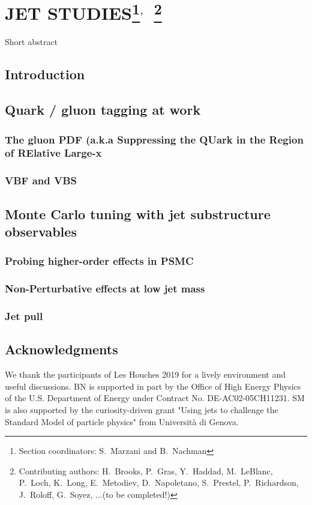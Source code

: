 \documentclass[11pt]{cernrep}
\begin{document}
\section{JET STUDIES\protect\footnote{Section coordinators: S.~Marzani and B.~Nachman}$^{,}$~\protect\footnote{Contributing authors: H.~Brooks, P.~Gras, Y.~Haddad, M.~LeBlanc, P.~Loch, K.~Long, E.~Metodiev, D.~Napoletano, S.~Prestel, P.~Richardson, J.~Roloff, G.~Soyez, ...(to be completed!)}}

Short abstract

\subsection{Introduction}

\subsection{Quark / gluon tagging at work}

\subsubsection{The gluon PDF (a.k.a Suppressing the QUark in the Region of RElative Large-x}

\subsubsection{VBF and VBS}

\subsection{Monte Carlo tuning with jet substructure observables}

\subsubsection{Probing higher-order effects in PSMC}

\subsubsection{Non-Perturbative effects at low jet mass}

\subsubsection{Jet pull}

\subsection*{Acknowledgments}

We thank the participants of Les Houches 2019 for a lively environment and useful discussions.
BN is supported in part by the Office of High Energy Physics of the U.S. Department of Energy under Contract No. DE-AC02-05CH11231.
%
SM is also supported by the curiosity-driven grant "Using jets to challenge the Standard Model of particle physics" from Universit\`a di Genova.


\end{document}
